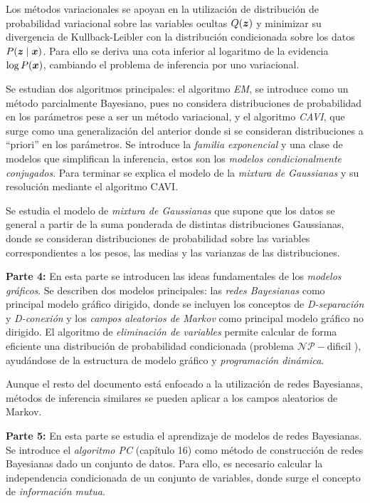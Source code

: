 Los métodos variacionales se apoyan en la utilización de distribución de probabilidad variacional sobre las variables ocultas \(Q(\bm{z})\) y minimizar su divergencia de Kullback-Leibler con la distribución condicionada sobre los datos \(P(\bm{z} \mid \bm{x})\). Para ello se deriva una cota inferior al logaritmo de la evidencia \(\log P(\bm{x})\), cambiando el problema de inferencia por uno variacional.

Se estudian dos algoritmos principales: el algoritmo \emph{EM}, se introduce como un método parcialmente Bayesiano, pues no considera distribuciones de probabilidad en los parámetros pese a ser un método variacional, y el algoritmo \emph{CAVI}, que surge como una generalización del anterior donde si se consideran distribuciones a ``priori'' en los parámetros. Se introduce la \emph{familia exponencial} y una clase de modelos que simplifican la inferencia, estos son los \emph{modelos condicionalmente conjugados}. Para terminar se explica el modelo de la \emph{mixtura de Gaussianas} y su resolución mediante el algoritmo CAVI.

Se estudia el modelo de \emph{mixtura de Gaussianas} que supone que los datos se general a partir de la suma ponderada de distintas distribuciones Gaussianas, donde se consideran distribuciones de probabilidad sobre las variables correspondientes a los pesos, las medias y las varianzas de las distribuciones.

\textbf{Parte 4:} En esta parte se introducen las ideas fundamentales de los \emph{modelos gráficos}. Se describen dos modelos principales: las \emph{redes Bayesianas} como principal modelo gráfico dirigido, donde se incluyen los conceptos de \emph{D-separación} y \emph{D-conexión} y los \emph{campos aleatorios de Markov} como principal modelo gráfico no dirigido. El algoritmo de \emph{eliminación de variables} permite calcular de forma eficiente una distribución de probabilidad condicionada (problema \(\mathcal{NP}-\)dificil ), ayudándose de la estructura de modelo gráfico y \emph{programación dinámica}.

Aunque el resto del documento está enfocado a la utilización de redes Bayesianas, métodos de inferencia similares se pueden aplicar a los campos aleatorios de Markov.

\textbf{Parte 5:} En esta parte se estudia el aprendizaje de modelos de redes Bayesianas. Se introduce el \emph{algoritmo PC} (capítulo 16) como método de construcción de redes Bayesianas dado un conjunto de datos. Para ello, es necesario calcular la independencia condicionada de un conjunto de variables, donde surge el concepto de \emph{información mutua}.

